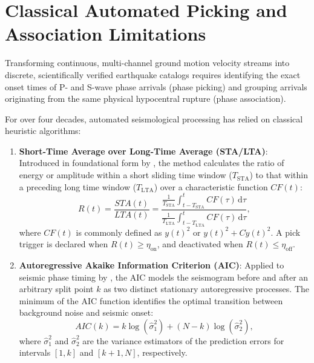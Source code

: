 \section{Classical Automated Picking and Association Limitations}
\label{sec:classical_picking}

Transforming continuous, multi-channel ground motion velocity streams into discrete, scientifically verified earthquake catalogs requires identifying the exact onset times of P- and S-wave phase arrivals (phase picking) and grouping arrivals originating from the same physical hypocentral rupture (phase association).

For over four decades, automated seismological processing has relied on classical heuristic algorithms:
\begin{enumerate}
  \item \textbf{Short-Time Average over Long-Time Average (\ac{STA/LTA})}: Introduced in foundational form by \textcite{STALTA}, the method calculates the ratio of energy or amplitude within a short sliding time window ($T_{\mathrm{STA}}$) to that within a preceding long time window ($T_{\mathrm{LTA}}$) over a characteristic function $\mathit{CF}(t)$:
  \begin{equation}
    R(t) = \frac{\mathit{STA}(t)}{\mathit{LTA}(t)} = \frac{\frac{1}{T_{\mathrm{STA}}}\int_{t-T_{\mathrm{STA}}}^t \mathit{CF}(\tau)\,\mathrm{d}\tau}{\frac{1}{T_{\mathrm{LTA}}}\int_{t-T_{\mathrm{LTA}}}^t \mathit{CF}(\tau)\,\mathrm{d}\tau},
    \label{eq:stalta}
  \end{equation}
  where $\mathit{CF}(t)$ is commonly defined as $y(t)^2$ or $y(t)^2 + C \dot{y}(t)^2$. A pick trigger is declared when $R(t) \ge \eta_{\mathrm{on}}$, and deactivated when $R(t) \le \eta_{\mathrm{off}}$.
  \item \textbf{Autoregressive Akaike Information Criterion (\ac{AIC})}: Applied to seismic phase timing by \textcite{LEONARD1999247}, the AIC models the seismogram before and after an arbitrary split point $k$ as two distinct stationary autoregressive processes. The minimum of the AIC function identifies the optimal transition between background noise and seismic onset:
  \begin{equation}
    \mathit{AIC}(k) = k \log(\hat{\sigma}_1^2) + (N - k) \log(\hat{\sigma}_2^2),
    \label{eq:aic}
  \end{equation}
  where $\hat{\sigma}_1^2$ and $\hat{\sigma}_2^2$ are the variance estimators of the prediction errors for intervals $[1, k]$ and $[k+1, N]$, respectively.
\end{enumerate}

